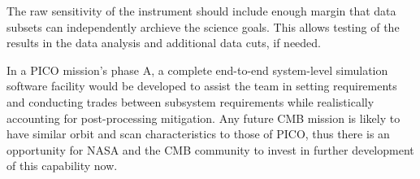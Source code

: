 \documentclass[PICOReport.tex]{subfiles}
\begin{document}
The raw sensitivity of the instrument should include enough margin
that data subsets can independently archieve the science goals.
This allows testing of the results in the data analysis and additional
data cuts, if needed.

In a PICO mission's phase A, a complete end-to-end system-level
simulation software facility would be developed to assist the team in setting 
requirements and conducting trades between subsystem requirements while
realistically accounting for post-processing mitigation.  Any future
CMB mission is likely to have similar orbit  
and scan characteristics to those of PICO, thus there is an opportunity for NASA and
the CMB community to invest in further development of this capability now.
\end{document}
